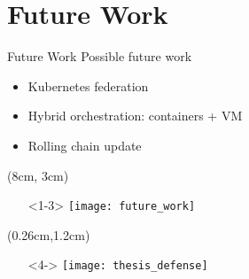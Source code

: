 \section{Future Work}
\begin{frame}{Future Work}
  Possible future work
  \begin{itemize}
  \item<1-> Kubernetes federation
  \item<2-> Hybrid orchestration: containers + VM
  \item<3-> Rolling chain update
  \end{itemize}

  \begin{textblock*}{5cm}(8cm, 3cm)
    \begin{itemize}
    \item[]<1-3> \texttt{[image: future\_work]}
    \end{itemize}
  \end{textblock*}

  \begin{textblock*}{5cm}(0.26cm,1.2cm)
    \begin{itemize}
      \item[]<4-> \centering \texttt{[image: thesis\_defense]}
    \end{itemize}
  \end{textblock*}
\end{frame}
